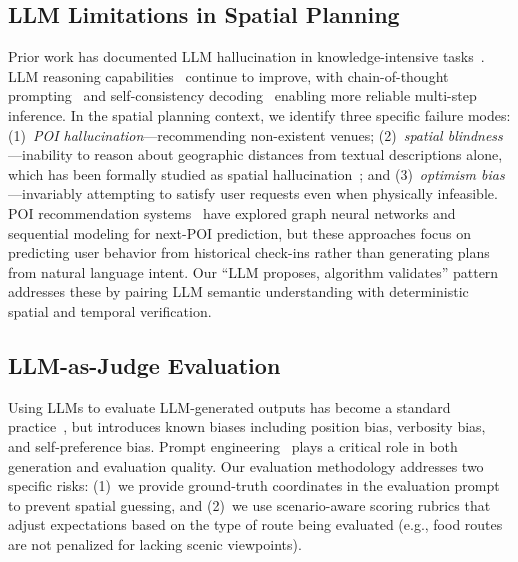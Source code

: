 \subsection{LLM Limitations in Spatial Planning}

Prior work has documented LLM hallucination in knowledge-intensive tasks~\cite{ji2023survey}. LLM reasoning capabilities~\cite{zhang2023reasoning} continue to improve, with chain-of-thought prompting~\cite{wei2022chain} and self-consistency decoding~\cite{wang2023selfconsistency} enabling more reliable multi-step inference. In the spatial planning context, we identify three specific failure modes: (1)~\textit{POI hallucination}---recommending non-existent venues; (2)~\textit{spatial blindness}---inability to reason about geographic distances from textual descriptions alone, which has been formally studied as spatial hallucination~\cite{gong2024spatial}; and (3)~\textit{optimism bias}---invariably attempting to satisfy user requests even when physically infeasible. POI recommendation systems~\cite{zhao2024poi} have explored graph neural networks and sequential modeling for next-POI prediction, but these approaches focus on predicting user behavior from historical check-ins rather than generating plans from natural language intent. Our ``LLM proposes, algorithm validates'' pattern addresses these by pairing LLM semantic understanding with deterministic spatial and temporal verification.

\subsection{LLM-as-Judge Evaluation}

Using LLMs to evaluate LLM-generated outputs has become a standard practice~\cite{gu2024llmjudge}, but introduces known biases including position bias, verbosity bias, and self-preference bias. Prompt engineering~\cite{park2024prompt,white2024prompt} plays a critical role in both generation and evaluation quality. Our evaluation methodology addresses two specific risks: (1)~we provide ground-truth coordinates in the evaluation prompt to prevent spatial guessing, and (2)~we use scenario-aware scoring rubrics that adjust expectations based on the type of route being evaluated (e.g., food routes are not penalized for lacking scenic viewpoints).
